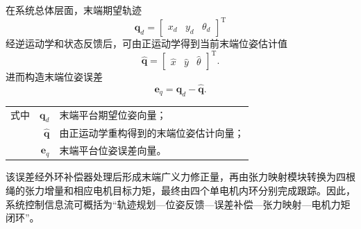 在系统总体层面，末端期望轨迹
\begin{equation}
  \bm q_d= \begin{bmatrix} x_d & y_d & \theta_d \end{bmatrix}^{\mathrm T}
\end{equation}
经逆运动学和状态反馈后，可由正运动学得到当前末端位姿估计值
\begin{equation}
  \hat{\bm q}= \begin{bmatrix} \hat{x} & \hat{y} & \hat{\theta} \end{bmatrix}^{\mathrm T}.
\end{equation}
进而构造末端位姿误差
\begin{equation}
  \bm e_q=\bm q_d-\hat{\bm q}. \label{eq:ch4-eq}
\end{equation}
\begin{tabularx}{\textwidth}{@{}l@{\quad}r@{———}X@{}}
  式中 & $\bm q_d$ & 末端平台期望位姿向量；\\
       & $\hat{\bm q}$ & 由正运动学重构得到的末端位姿估计向量；\\
       & $\bm e_q$ & 末端平台位姿误差向量。
\end{tabularx}

该误差经外环补偿器处理后形成末端广义力修正量，再由张力映射模块转换为四根绳的张力增量和相应电机目标力矩，最终由四个单电机内环分别完成跟踪。因此，系统控制信息流可概括为“轨迹规划—位姿反馈—误差补偿—张力映射—电机力矩闭环”。

